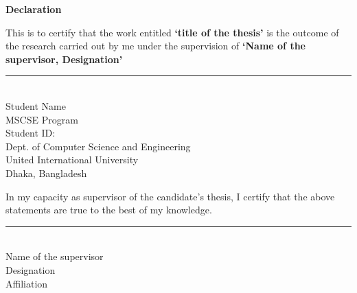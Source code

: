 
\begin{flushleft}
    \textbf{\LARGE Declaration}


\vspace{1cm}

\noindent This is to certify that the work entitled \textbf{`title of the thesis'} is the outcome of the research carried out by me under the supervision of \textbf{`Name of the supervisor, Designation'}

\vspace{2cm}

\noindent\rule{8cm}{0.4pt} \\
Student Name \\
MSCSE Program\\
Student ID: \\
Dept. of Computer Science and Engineering \\
United International University \\
Dhaka, Bangladesh

\vspace{4cm}

\noindent In my capacity as supervisor of the candidate’s thesis, I certify that the above statements are true to the best of my knowledge.

\vspace{4cm}

\noindent\rule{8cm}{0.4pt} \\
Name of the supervisor\\
Designation\\
Affiliation \\
\vspace{0.2cm}


\end{flushleft}

\pagebreak